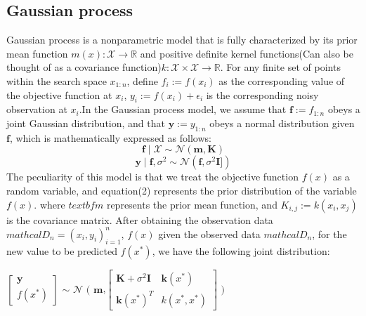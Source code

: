 \documentclass{article}
\begin{document}
\subsection{Gaussian process}
\hspace{2em}Gaussian process is a nonparametric model that is fully characterized by its prior mean function $m(x):\mathcal{X} \rightarrow \mathbb{R}$ and positive definite kernel functions(Can also be thought of as a covariance function)$k:\mathcal{X} \times \mathcal{X} \rightarrow \mathbb{R}$. For any finite set of points within the search space $x_{1:n}$, define $f_i:=f(x_i)$ as the corresponding value of the objective function at $x_i$, $y_i:=f(x_i)+\epsilon_i$ is the corresponding noisy observation at $x_i$.In the Gaussian process model, we assume that $\textbf{f}:=f_{1:n}$ obeys a joint Gaussian distribution, and that $\textbf{y}:=y_{1:n}$ obeys a normal distribution given $\textbf{f}$, which is mathematically expressed as follows:
\begin{equation}\label{eq2}
    \textbf{f}\mid\mathcal{X} \sim \mathcal{N}(\textbf{m},\textbf{K})
    \end{equation}
    \begin{equation}\label{eq3}
    \textbf{y}\mid \textbf{f},\sigma^2 \sim \mathcal{N}(\textbf{f},\sigma^2\textbf{I}])
    \end{equation}
The peculiarity of this model is that we treat the objective function $f(x)$ as a random variable, and equation(2) represents the prior distribution of the variable $f(x)$. where $textbf{m}$ represents the prior mean function, and $K_{i,j}:=k(x_i,x_j)$ is the covariance matrix. After obtaining the observation data $mathcal{D}_n={(x_i,y_i)^n_{i=1}}$, $f(x)$ given the observed data $mathcal{D}_n$, for the new value to be predicted $f(x^*)$, we have the following joint distribution:

\hspace*{\fill}

\qquad \qquad \qquad \quad \quad \quad \quad \quad \quad \quad \quad \quad $\begin{bmatrix} \textbf{y} \\ f(x^*) \end{bmatrix}$ $\sim$ 
$\mathcal{N}$ $\Biggl($ $\textbf{m}$,$\begin{bmatrix} \textbf{K}+\sigma^2\textbf{I} & \textbf{k} (x^*)\\ 
\textbf{k} (x^*)^T & k(x^*,x^*) \end{bmatrix}$ $\Biggl)$\\
\end{document}
